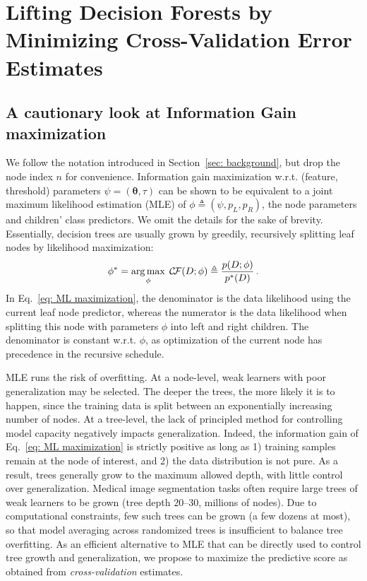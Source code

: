 
\section{Lifting Decision Forests by Minimizing Cross-Validation Error Estimates}
\label{sec: lifting}

\subsection{A cautionary look at Information Gain maximization}

We follow the notation introduced in Section~\ref{sec: background}, but drop the node index $n$ for convenience. 
Information gain maximization w.r.t. (feature, threshold) parameters $\psi=(\bm{\theta},\tau)$ can be shown to be equivalent to a joint maximum likelihood estimation (MLE) of $\phi\!\triangleq\!(\psi,p_L,p_R)$, the node parameters and children' class predictors. We omit the details for the sake of brevity. Essentially, decision trees are usually grown by 
greedily, recursively splitting leaf nodes by likelihood maximization:
\begin{equation}
\phi^\ast = \operatorname*{arg\,max}_{\phi} \; \mathcal{C}\!\mathcal{F}(D;\phi) \triangleq \frac{p(D;\phi)}{p^\ast(D)} \, .
\label{eq: ML maximization}
\end{equation}
In Eq.~\eqref{eq: ML maximization}, the denominator is the data likelihood using the current leaf node predictor, whereas the numerator is the data likelihood when splitting this node with parameters $\phi$ into left and right children. The denominator is constant w.r.t. $\phi$, as optimization of the current node has precedence in the recursive schedule. 

MLE runs the risk of overfitting. At a node-level, weak learners with poor generalization may be selected. The deeper the trees, the more likely it is to happen, since the training data is split between an exponentially increasing number of nodes. At a tree-level, the lack of principled method
for controlling model capacity negatively impacts generalization. Indeed, the information gain of Eq.~\eqref{eq: ML maximization} is strictly positive as long as 1) training samples remain at the node of interest, and 
  2) the data distribution is not pure. As a result, trees generally grow to the maximum allowed depth, with little control over generalization. Medical image segmentation tasks often require large trees of weak learners to be grown (tree depth $20$--$30$, millions of nodes). Due to computational constraints, few such trees can be grown (a few dozens at most), so that model averaging across randomized trees is insufficient to balance tree overfitting. As an efficient alternative to MLE that can be directly used to control tree growth and generalization, we propose to maximize the predictive score as obtained from \textit{cross-validation} estimates.

